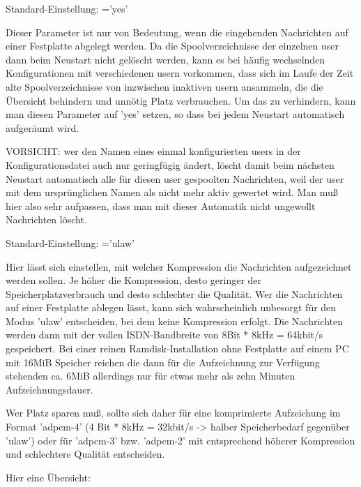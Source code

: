 \begin{description}
    Standard-Einstellung: ='yes'
    
    Dieser Parameter ist nur von Bedeutung, wenn die eingehenden Nachrichten auf einer 
    Festplatte abgelegt werden. Da die Spoolverzeichnisse der einzelnen user dann beim Neustart 
    nicht gelöscht werden, kann es bei häufig wechselnden Konfigurationen mit verschiedenen
    usern vorkommen, dass sich im Laufe der Zeit alte Spoolverzeichnisse von inzwischen inaktiven
    usern ansammeln, die die Übersicht behindern und unnötig Platz verbrauchen. 
    Um das zu verhindern, kann man diesen Parameter auf 'yes' setzen, so dass bei jedem Neustart 
    automatisch aufgeräumt wird.

    VORSICHT: wer den Namen eines einmal konfigurierten users in der Konfigurationsdatei auch nur 
    geringfügig ändert, löscht damit beim nächsten Neustart automatisch alle für diesen user 
    gespoolten Nachrichten, weil der user mit dem ursprünglichen Namen als nicht mehr aktiv gewertet wird. 
    Man muß hier also sehr aufpassen, dass man mit dieser Automatik nicht ungewollt Nachrichten löscht.


    Standard-Einstellung: ='ulaw'
    
    Hier lässt sich einstellen, mit welcher Kompression die Nachrichten aufgezeichnet werden sollen. 
    Je höher die Kompression, desto geringer der Speicherplatzverbrauch und desto schlechter die Qualität.
    Wer die Nachrichten auf einer Festplatte ablegen lässt, kann sich wahrscheinlich unbesorgt für den Modus 
    'ulaw' entscheiden, bei dem keine Kompression erfolgt. Die Nachrichten werden dann mit der vollen 
    ISDN-Bandbreite von 8Bit * 8kHz = 64kbit/s gespeichert. Bei einer reinen Ramdisk-Installation ohne 
    Festplatte auf einem PC mit 16MiB Speicher reichen die dann für die Aufzeichnung zur Verfügung stehenden 
    ca. 6MiB allerdings nur für etwas mehr als zehn Minuten Aufzeichnungsdauer.

    Wer Platz sparen muß, sollte sich daher für eine komprimierte Aufzeichung im Format 'adpcm-4' 
    (4 Bit * 8kHz = 32kbit/s -> halber Speicherbedarf gegenüber 'ulaw') 
    oder für 'adpcm-3' bzw. 'adpcm-2' mit entsprechend höherer Kompression und 
    schlechtere Qualität entscheiden.

    Hier eine Übersicht:


\end{description}
